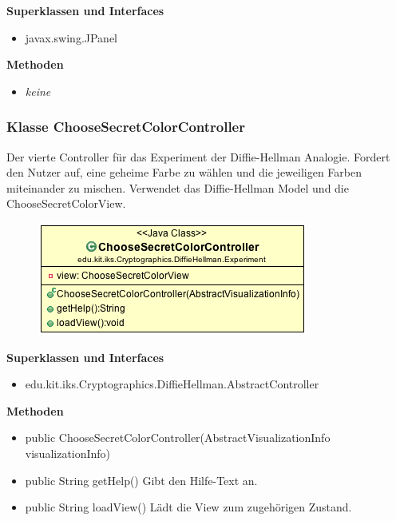 \documentclass{article}
\begin{document}
      \textbf{Superklassen und Interfaces}
      \begin{itemize}
        \item javax.swing.JPanel
      \end{itemize}

      \textbf{Methoden}
      \begin{itemize}
        \item \textit{keine}
      \end{itemize}

\subsubsection{Klasse ChooseSecretColorController}
      Der vierte Controller für das Experiment der Diffie-Hellman Analogie.
      Fordert den Nutzer auf, eine geheime Farbe zu wählen und die
      jeweiligen Farben miteinander zu mischen.
      Verwendet das Diffie-Hellman Model und die ChooseSecretColorView.

      \begin{figure}[H]
        \centering
        \includegraphics{resources/edu-kit-iks-Cryptographics-DiffieHellman-Experiment-ChooseSecretColorController}
      \end{figure}

      \textbf{Superklassen und Interfaces}
      \begin{itemize}
        \item edu.kit.iks.Cryptographics.DiffieHellman.AbstractController
      \end{itemize}

      \textbf{Methoden}
      \begin{itemize}
          \item public ChooseSecretColorController(AbstractVisualizationInfo visualizationInfo)
        \item public String getHelp() \newline
        Gibt den Hilfe-Text an.
        \item public String loadView() \newline
        Lädt die View zum zugehörigen Zustand.
      \end{itemize}
\end{document}
